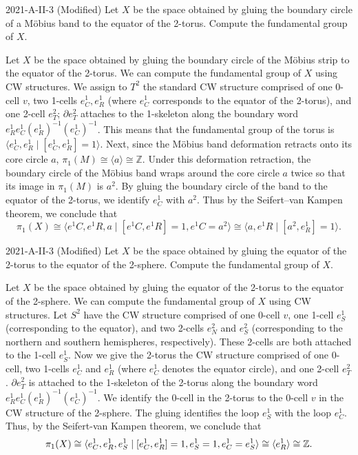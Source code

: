 \documentclass{article}
\begin{document}
	\begin{prb}{2021-A-II-3 (Modified)}
		Let $X$ be the space obtained by gluing the boundary circle of a M\"obius band to the equator of the 2-torus. Compute the fundamental group of $X$. 
	\end{prb}
	Let $X$ be the space obtained by gluing the boundary circle of the Möbius strip to the equator of the 2-torus. We can compute the fundamental group of $X$ using CW structures. We assign to $T^{2}$ the standard CW structure comprised of one 0-cell $v$, two 1-cells $e^{1}_{C}, e^{1}_{R}$ (where $e^{1}_{C}$ corresponds to the equator of the 2-torus), and one 2-cell $e^{2}_{T}$; $\partial e^{2}_{T}$ attaches to the 1-skeleton along the boundary word $e^{1}_{R}e^{1}_{C}(e^{1}_{R})^{-1}(e^{1}_{C})^{-1}$. This means that the fundamental group of the torus is $\langle e^{1}_{C}, e^{1}_{R} \mid [e^{1}_{C}, e^{1}_{R}] = 1 \rangle$. Next, since the Möbius band deformation retracts onto its core circle $a$, $\pi_{1}(M) \cong \langle a \rangle \cong \mathbb{Z}$. Under this deformation retraction, the boundary circle of the Möbius band wraps around the core circle $a$ twice so that its image in $\pi_{1}(M)$ is $a^{2}$. By gluing the boundary circle of the band to the equator of the 2-torus, we identify $e^{1}_{C}$ with $a^{2}$. Thus by the Seifert–van Kampen theorem, we conclude that
	\begin{equation*}
		\pi_{1}(X) \cong \langle e^{1}{C}, e^{1}{R}, a \mid [e^{1}{C}, e^{1}{R}] = 1, e^{1}{C} = a^{2} \rangle \cong \langle a, e^{1}{R} \mid [a^{2}, e^{1}_{R}] = 1 \rangle.
	\end{equation*}
	
	\begin{prb}{2021-A-II-3 (Modified)}
		Let $X$ be the space obtained by gluing the equator of the 2-torus to the equator of the 2-sphere. Compute the fundamental group of $X$. 
	\end{prb}
	Let $X$ be the space obtained by gluing the equator of the 2-torus to the equator of the 2-sphere. We can compute the fundamental group of $X$ using CW structures. Let $S^{2}$ have the CW structure comprised of one 0-cell $v$, one 1-cell $e^{1}_{S}$ (corresponding to the equator), and two 2-cells $e^{2}_{N}$ and $e^{2}_{S}$ (corresponding to the northern and southern hemispheres, respectively). These 2-cells are both attached to the 1-cell $e^{1}_{S}$. Now we give the 2-torus the CW structure comprised of one 0-cell, two 1-cells $e^{1}_{C}$ and $e^{1}_{R}$ (where $e^{1}_{C}$ denotes the equator circle), and one 2-cell $e^{2}_{T}$. $\partial e^{2}_{T}$ is attached to the 1-skeleton of the 2-torus along the boundary word $e^{1}_{R}e^{1}_{C}(e^{1}_{R})^{-1}(e^{1}_{C})^{-1}$. We identify the 0-cell in the 2-torus to the 0-cell $v$ in the CW structure of the 2-sphere. The gluing identifies the loop $e^{1}_{S}$ with the loop $e^{1}_{C}$. Thus, by the Seifert-van Kampen theorem, we conclude that 
	\begin{equation*}
		\pi_{1}(X) \cong \braket{e^{1}_{C}, e^{1}_{R}, e^{1}_{S} \mid [e^{1}_{C}, e^{1}_{R}] = 1, e^{1}_{S} = 1,  e^{1}_{C} = e^{1}_{S}} \cong \braket{e^{1}_{R}} \cong \mathbb{Z}. 
	\end{equation*}
	
\end{document}
